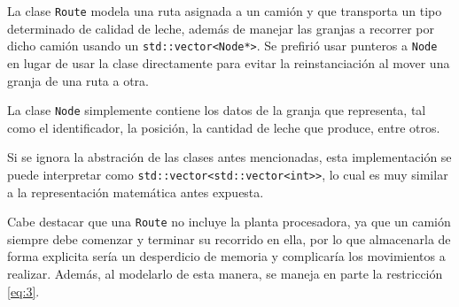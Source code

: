 La clase \texttt{Route} modela una ruta asignada a un camión y que transporta un tipo determinado de calidad de leche, además de manejar las granjas a recorrer por dicho camión usando un \texttt{std::vector<Node*>}. Se prefirió usar punteros a \texttt{Node} en lugar de usar la clase directamente para evitar la reinstanciación al mover una granja de una ruta a otra.

La clase \texttt{Node} simplemente contiene los datos de la granja que representa, tal como el identificador, la posición, la cantidad de leche que produce, entre otros.

Si se ignora la abstración de las clases antes mencionadas, esta implementación se puede interpretar como \texttt{std::vector<{\phantom{.}}std::vector<int>{\phantom{.}}>}, lo cual es muy similar a la representación matemática antes expuesta.

Cabe destacar que una \texttt{Route} no incluye la planta procesadora, ya que un camión siempre debe comenzar y terminar su recorrido en ella, por lo que almacenarla de forma explicita sería un desperdicio de memoria y complicaría los movimientos a realizar. Además, al modelarlo de esta manera, se maneja en parte la restricción \ref{eq:3}.
